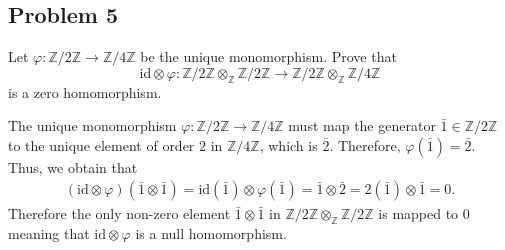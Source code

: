 \subsection*{Problem 5}
Let $\varphi : \mathbb{Z}/2\mathbb{Z} \to \mathbb{Z}/4\mathbb{Z}$ be the unique monomorphism. Prove that 
\[ \text{id} \otimes \varphi : \mathbb{Z}/2\mathbb{Z} \otimes_{\mathbb{Z}} \mathbb{Z}/2\mathbb{Z} \to \mathbb{Z}/2\mathbb{Z} \otimes_{\mathbb{Z}} \mathbb{Z}/4\mathbb{Z} \]
is a zero homomorphism.
\begin{solution}
    The unique monomorphism $\varphi : \mathbb{Z}/2\mathbb{Z} \to \mathbb{Z}/4\mathbb{Z}$ must map the generator $\bar{1} \in \mathbb{Z}/2\mathbb{Z}$ to the unique element of order $2$ in $\mathbb{Z}/4\mathbb{Z}$, which is $\bar{2}$. Therefore, $\varphi(\bar{1}) = \bar{2}$. 
    Thus, we obtain that 
    \begin{align*}
        (\text{id} \otimes \varphi)(\bar{1} \otimes \bar{1}) = \text{id}(\bar{1}) \otimes \varphi(\bar{1}) = \bar{1} \otimes \bar{2} = 2(\bar{1})\otimes \bar{1} = 0.
    \end{align*}
    Therefore the only non-zero element $\bar{1} \otimes \bar{1}$ in $\mathbb{Z}/2\mathbb{Z} \otimes_{\mathbb{Z}} \mathbb{Z}/2\mathbb{Z}$ is mapped to 0 meaning that $\text{id} \otimes \varphi$ is a null homomorphism.
\end{solution}



